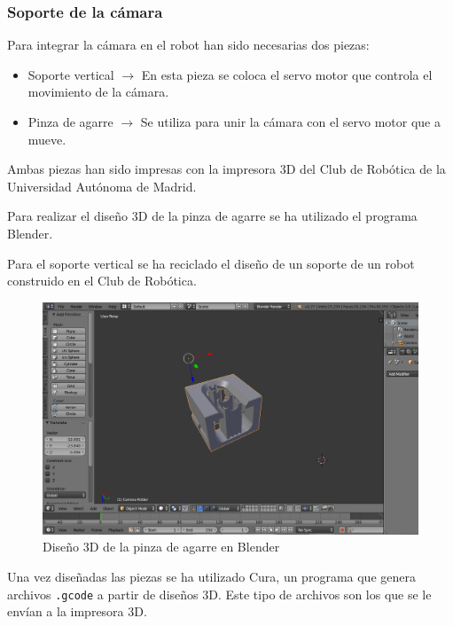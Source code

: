 \documentclass[twoside, 12pt]{epstfg}
\begin{document}
\subsubsection{Soporte de la cámara}

Para integrar la cámara en el robot han sido necesarias dos piezas:

\begin{itemize}
	\item Soporte vertical $\rightarrow$ En esta pieza se coloca el servo motor que controla el movimiento de la cámara.
	
	\item Pinza de agarre $\rightarrow$ Se utiliza para unir la cámara con el servo motor que a mueve.
\end{itemize}

Ambas piezas han sido impresas con la impresora 3D del Club de Robótica de la Universidad Autónoma de Madrid.

Para realizar el diseño 3D de la pinza de agarre se ha utilizado el programa Blender.

Para el soporte vertical se ha reciclado el diseño de un soporte de un robot construido en el Club de Robótica.

\begin{figure}[h]
	\centerline{
		\mbox{\includegraphics[width=.80\textwidth]{images/cameraBlender.png}}
	}
	\caption{ Diseño 3D de la pinza de agarre en Blender}
\end{figure}

Una vez diseñadas las piezas se ha utilizado Cura, un programa que genera archivos \texttt{.gcode} a partir de diseños 3D. Este tipo de archivos son los que se le envían a la impresora 3D.
\end{document}
